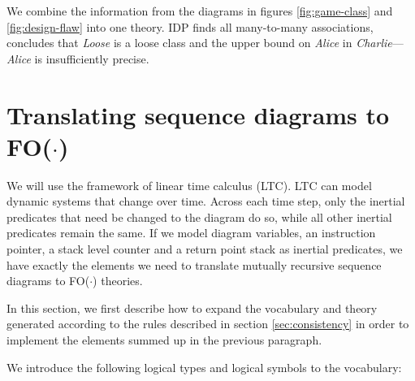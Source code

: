 \documentclass[conference]{IEEEtran}
\begin{document}
We combine the information from the diagrams in figures \ref{fig:game-class} and \ref{fig:design-flaw} into one theory. IDP finds all many-to-many associations, concludes that \textit{Loose} is a loose class and the upper bound on \textit{Alice} in \textit{Charlie}---\textit{Alice} is insufficiently precise.

\section{Translating sequence diagrams to FO($\cdot$)}\label{sec:seq}
We will use the framework of linear time calculus\cite{BogaertsBart2014Sdsu} (LTC). LTC can model dynamic systems that change over time. Across each time step, only the inertial predicates that need be changed to the diagram do so, while all other inertial predicates remain the same. If we model diagram variables, an instruction pointer, a stack level counter and a return point stack as inertial predicates, we have exactly the elements we need to translate mutually recursive sequence diagrams to FO($\cdot$) theories.

In this section, we first describe how to expand the vocabulary and theory generated according to the rules described in section \ref{sec:consistency} in order to implement the elements summed up in the previous paragraph.

We introduce the following logical types and logical symbols to the vocabulary:
\end{document}
